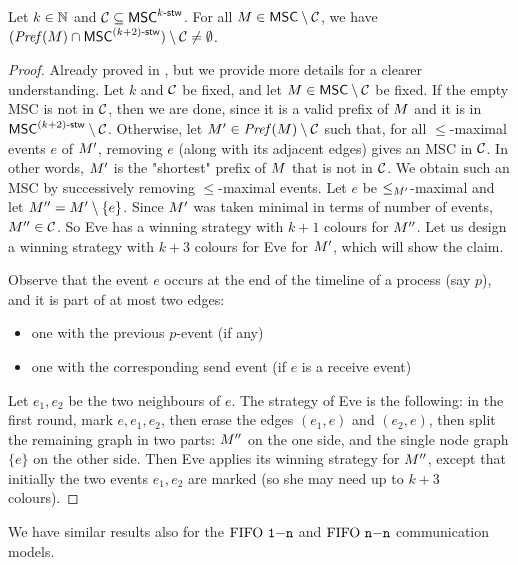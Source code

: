 \begin{proposition}\label{prop:pref_stw_k+2}
	Let $k \in \mathbb{N}$ and $\mathcal{C} \subseteq \mathsf{MSC}^{k\textup{-}\mathsf{stw}}$. For all
	$M \in \mathsf{MSC} \setminus \mathcal{C}$, we have
	$(\mathit{Pref}(M) \cap \mathsf{MSC}^{(k+2)\textup{-}\mathsf{stw}}) \setminus \mathcal{C} \neq \emptyset$.
\end{proposition}
\begin{proof}
    Already proved in \cite{BolligGFLLS21}, but we provide more details for a clearer understanding.
    Let $k$ and $\mathcal{C}$ be fixed, and let
    $M\in \mathsf{MSC}\setminus \mathcal{C}$ be fixed. If the empty MSC is not in $\mathcal{C}$, then we are done, since it is a valid prefix of $M$ and it is in $\mathsf{MSC}^{(k+2)\textup{-}\mathsf{stw}} \setminus \mathcal{C}$.
    Otherwise, let $M'\in \mathit{Pref}(M) \setminus \mathcal{C}$ such that, for all $\le$-maximal events $e$ of $M'$, removing $e$ (along with its adjacent edges) gives an MSC in $\mathcal{C}$. In other words, $M'$ is the "shortest" prefix of $M$ that is not in $\mathcal{C}$. We obtain such an MSC by successively removing $\le$-maximal events. Let $e$ be $\le_{M'}$-maximal and let $M''=M' \setminus \{e\}$. Since $M'$ was taken minimal in terms of number of events,	$M''\in \mathcal{C}$.
    So Eve has a winning strategy with $k+1$ colours for $M''$.
    Let us design a winning strategy with $k+3$ colours for Eve for $M'$, which will show the claim.

    Observe that the event $e$ occurs at the end of the timeline of a process (say $p$), and it is part of at most two edges:
    \begin{itemize}
        \item one with the previous $p$-event (if any)
        \item one with the corresponding send event (if $e$ is a receive event)
    \end{itemize}
    Let $e_1,e_2$ be the two neighbours of $e$.
    The strategy of Eve is the following: in the first round, mark $e,e_1,e_2$,
    then erase the edges $(e_1,e)$ and $(e_2,e)$, then split the remaining graph
    in two parts: $M''$ on the one side, and the single node graph $\{e\}$ on
    the other side. Then Eve applies its winning strategy for $M''$, except
    that initially the two events $e_1,e_2$ are marked (so she may need up to $k+3$
    colours).
\end{proof}

We have similar results also for the $\text{FIFO } \mathtt{1\mathsf{-}n}$ and $\text{FIFO } \mathtt{n\mathsf{-}n}$ communication models.


